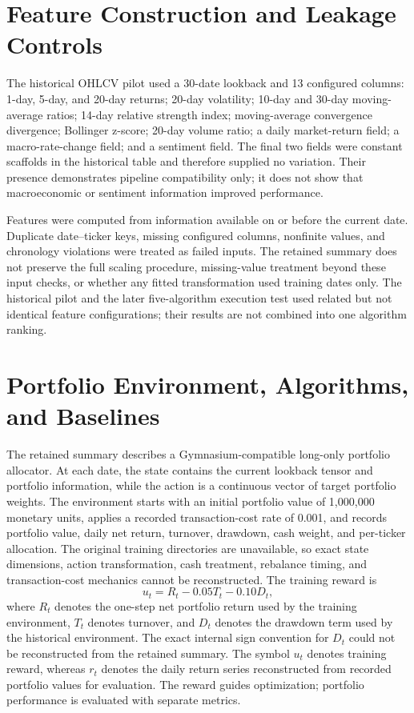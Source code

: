 \documentclass[12pt,a4paper,oneside]{book}
\theoremstyle{plain}
\numberwithin{equation}{chapter} \DeclareMathOperator{\Var}{Var}
\begin{document}
\section{Feature Construction and Leakage Controls}

The historical OHLCV pilot used a 30-date lookback and 13 configured columns: 1-day, 5-day, and 20-day returns; 20-day volatility; 10-day and 30-day moving-average ratios; 14-day relative strength index; moving-average convergence divergence; Bollinger z-score; 20-day volume ratio; a daily market-return field; a macro-rate-change field; and a sentiment field. The final two fields were constant scaffolds in the historical table and therefore supplied no variation. Their presence demonstrates pipeline compatibility only; it does not show that macroeconomic or sentiment information improved performance.

Features were computed from information available on or before the current date. Duplicate date--ticker keys, missing configured columns, nonfinite values, and chronology violations were treated as failed inputs. The retained summary does not preserve the full scaling procedure, missing-value treatment beyond these input checks, or whether any fitted transformation used training dates only. The historical pilot and the later five-algorithm execution test used related but not identical feature configurations; their results are not combined into one algorithm ranking.

\section{Portfolio Environment, Algorithms, and Baselines}

The retained summary describes a Gymnasium-compatible long-only portfolio allocator. At each date, the state contains the current lookback tensor and portfolio information, while the action is a continuous vector of target portfolio weights. The environment starts with an initial portfolio value of 1,000,000 monetary units, applies a recorded transaction-cost rate of 0.001, and records portfolio value, daily net return, turnover, drawdown, cash weight, and per-ticker allocation. The original training directories are unavailable, so exact state dimensions, action transformation, cash treatment, rebalance timing, and transaction-cost mechanics cannot be reconstructed. The training reward is
\begin{equation}
  u_t = R_t - 0.05T_t - 0.10D_t,
  \label{eq:reward}
\end{equation}
where $R_t$ denotes the one-step net portfolio return used by the training environment, $T_t$ denotes turnover, and $D_t$ denotes the drawdown term used by the historical environment. The exact internal sign convention for $D_t$ could not be reconstructed from the retained summary. The symbol $u_t$ denotes training reward, whereas $r_t$ denotes the daily return series reconstructed from recorded portfolio values for evaluation. The reward guides optimization; portfolio performance is evaluated with separate metrics.
\end{document}
